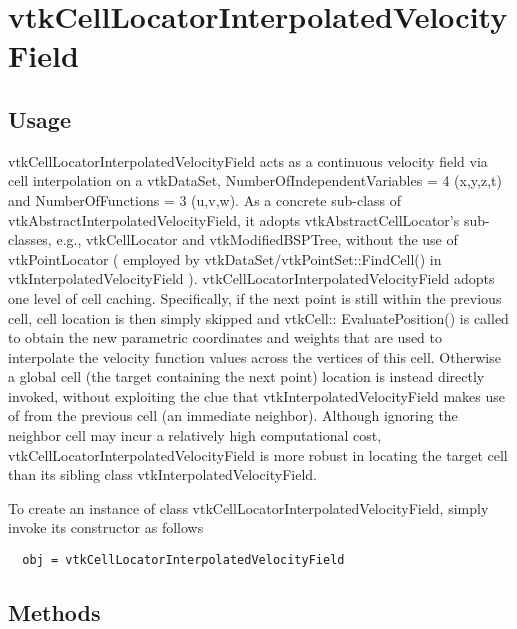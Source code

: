 \section{vtkCellLocatorInterpolatedVelocityField}

\subsection{Usage}

  vtkCellLocatorInterpolatedVelocityField acts as a continuous velocity 
  field via cell interpolation on a vtkDataSet, NumberOfIndependentVariables
  = 4 (x,y,z,t) and NumberOfFunctions = 3 (u,v,w). As a concrete sub-class
  of vtkAbstractInterpolatedVelocityField, it adopts vtkAbstractCellLocator's 
  sub-classes, e.g., vtkCellLocator and vtkModifiedBSPTree, without the use
  of vtkPointLocator ( employed by vtkDataSet/vtkPointSet::FindCell() in 
  vtkInterpolatedVelocityField ). vtkCellLocatorInterpolatedVelocityField 
  adopts one level of cell caching. Specifically, if the next point is still 
  within the previous cell, cell location is then simply skipped and vtkCell::
  EvaluatePosition() is called to obtain the new parametric coordinates and 
  weights that are used to interpolate the velocity function values across the
  vertices of this cell. Otherwise a global cell (the target containing the next
  point) location is instead directly invoked, without exploiting the clue that
  vtkInterpolatedVelocityField makes use of from the previous cell (an immediate
  neighbor). Although ignoring the neighbor cell may incur a relatively high 
  computational cost, vtkCellLocatorInterpolatedVelocityField is more robust in
  locating the target cell than its sibling class vtkInterpolatedVelocityField.

To create an instance of class vtkCellLocatorInterpolatedVelocityField, simply
invoke its constructor as follows
\begin{verbatim}
  obj = vtkCellLocatorInterpolatedVelocityField
\end{verbatim}
\subsection{Methods}

